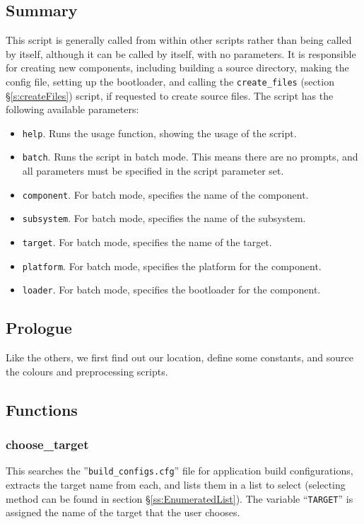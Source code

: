 \documentclass[a4paper, oneside, 11pt, titlepage, onecolumn, openright]{report}
\begin{document}
\subsection{Summary}
			\label{ss:crecompSummary}
			This script is generally called from within other scripts rather than being called by itself, although it can be called by itself, with no parameters. It is responsible for creating new components, including building a source directory, making the config file, setting up the bootloader, and calling the \texttt{create\_files} (section \S\ref{s:createFiles}) script, if requested to create source files.
			The script has the following available parameters:
			
\begin{itemize}
\item \texttt{help}. Runs the usage function, showing the usage of the script.
\item \texttt{batch}. Runs the script in batch mode. This means there are no prompts, and all parameters must be specified in the script parameter set.
\item \texttt{component}. For batch mode, specifies the name of the component.
\item \texttt{subsystem}. For batch mode, specifies the name of the subsystem.
\item \texttt{target}. For batch mode, specifies the name of the target.
\item \texttt{platform}. For batch mode, specifies the platform for the component.
\item \texttt{loader}. For batch mode, specifies the bootloader for the component.
\end{itemize}
			
\subsection{Prologue}
			\label{ss:crecompPrologue}
			Like the others, we first find out our location, define some constants, and source the colours and preprocessing scripts.
			
\subsection{Functions}
			\label{ss:crecompFunctions}
			
\subsubsection{choose\_target}
			\label{sss:crecompChooseTarget}
			This searches the ''\texttt{build\_configs.cfg}'' file for application build configurations, extracts the target name from each, and lists them in a list to select (selecting method can be found in section \S\ref{ss:EnumeratedList}). 
			The variable ``\texttt{TARGET}'' is assigned the name of the target that the user chooses.
			
\end{document}
